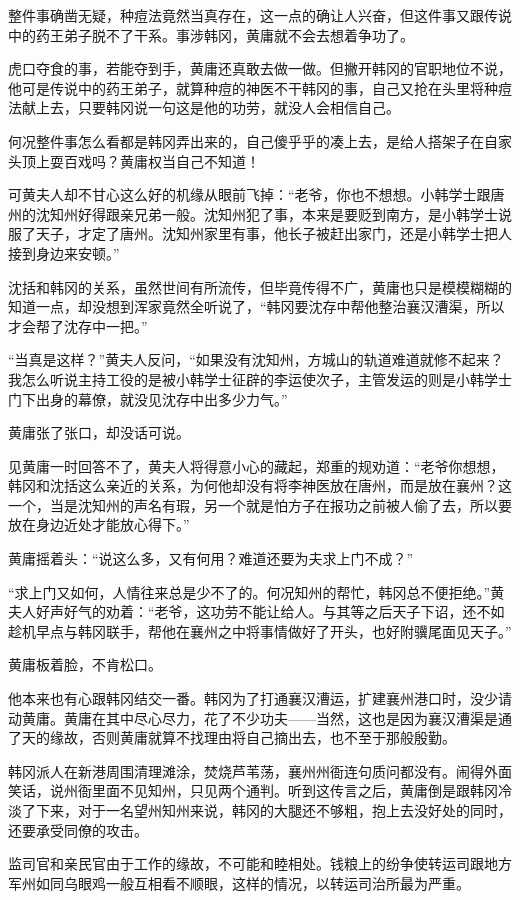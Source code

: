 整件事确凿无疑，种痘法竟然当真存在，这一点的确让人兴奋，但这件事又跟传说中的药王弟子脱不了干系。事涉韩冈，黄庸就不会去想着争功了。

虎口夺食的事，若能夺到手，黄庸还真敢去做一做。但撇开韩冈的官职地位不说，他可是传说中的药王弟子，就算种痘的神医不干韩冈的事，自己又抢在头里将种痘法献上去，只要韩冈说一句这是他的功劳，就没人会相信自己。

何况整件事怎么看都是韩冈弄出来的，自己傻乎乎的凑上去，是给人搭架子在自家头顶上耍百戏吗？黄庸权当自己不知道！

可黄夫人却不甘心这么好的机缘从眼前飞掉：“老爷，你也不想想。小韩学士跟唐州的沈知州好得跟亲兄弟一般。沈知州犯了事，本来是要贬到南方，是小韩学士说服了天子，才定了唐州。沈知州家里有事，他长子被赶出家门，还是小韩学士把人接到身边来安顿。”

沈括和韩冈的关系，虽然世间有所流传，但毕竟传得不广，黄庸也只是模模糊糊的知道一点，却没想到浑家竟然全听说了，“韩冈要沈存中帮他整治襄汉漕渠，所以才会帮了沈存中一把。”

“当真是这样？”黄夫人反问，“如果没有沈知州，方城山的轨道难道就修不起来？我怎么听说主持工役的是被小韩学士征辟的李运使次子，主管发运的则是小韩学士门下出身的幕僚，就没见沈存中出多少力气。”

黄庸张了张口，却没话可说。

见黄庸一时回答不了，黄夫人将得意小心的藏起，郑重的规劝道：“老爷你想想，韩冈和沈括这么亲近的关系，为何他却没有将李神医放在唐州，而是放在襄州？这一个，当是沈知州的声名有瑕，另一个就是怕方子在报功之前被人偷了去，所以要放在身边近处才能放心得下。”

黄庸摇着头：“说这么多，又有何用？难道还要为夫求上门不成？”

“求上门又如何，人情往来总是少不了的。何况知州的帮忙，韩冈总不便拒绝。”黄夫人好声好气的劝着：“老爷，这功劳不能让给人。与其等之后天子下诏，还不如趁机早点与韩冈联手，帮他在襄州之中将事情做好了开头，也好附骥尾面见天子。”

黄庸板着脸，不肯松口。

他本来也有心跟韩冈结交一番。韩冈为了打通襄汉漕运，扩建襄州港口时，没少请动黄庸。黄庸在其中尽心尽力，花了不少功夫——当然，这也是因为襄汉漕渠是通了天的缘故，否则黄庸就算不找理由将自己摘出去，也不至于那般殷勤。

韩冈派人在新港周围清理滩涂，焚烧芦苇荡，襄州州衙连句质问都没有。闹得外面笑话，说州衙里面不见知州，只见两个通判。听到这传言之后，黄庸倒是跟韩冈冷淡了下来，对于一名望州知州来说，韩冈的大腿还不够粗，抱上去没好处的同时，还要承受同僚的攻击。

监司官和亲民官由于工作的缘故，不可能和睦相处。钱粮上的纷争使转运司跟地方军州如同乌眼鸡一般互相看不顺眼，这样的情况，以转运司治所最为严重。

